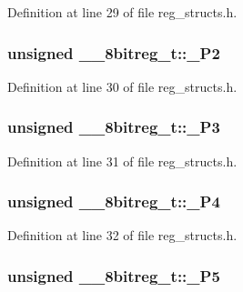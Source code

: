 Definition at line 29 of file reg\-\_\-structs.\-h.

\hypertarget{union____8bitreg__t_a30b9937367ef01f1adc9f4353c9c323e}{
\subsubsection[{\-\_\-\-P2}]{\setlength{\rightskip}{0pt plus 5cm}unsigned \-\_\-\-\_\-8bitreg\-\_\-t\-::\-\_\-\-P2}}\label{union____8bitreg__t_a30b9937367ef01f1adc9f4353c9c323e}


Definition at line 30 of file reg\-\_\-structs.\-h.

\hypertarget{union____8bitreg__t_a5d21a8af52e9e72f540bc6032d7c1047}{
\subsubsection[{\-\_\-\-P3}]{\setlength{\rightskip}{0pt plus 5cm}unsigned \-\_\-\-\_\-8bitreg\-\_\-t\-::\-\_\-\-P3}}\label{union____8bitreg__t_a5d21a8af52e9e72f540bc6032d7c1047}


Definition at line 31 of file reg\-\_\-structs.\-h.

\hypertarget{union____8bitreg__t_a8e1225a088df1088350fd78a57fa38b4}{
\subsubsection[{\-\_\-\-P4}]{\setlength{\rightskip}{0pt plus 5cm}unsigned \-\_\-\-\_\-8bitreg\-\_\-t\-::\-\_\-\-P4}}\label{union____8bitreg__t_a8e1225a088df1088350fd78a57fa38b4}


Definition at line 32 of file reg\-\_\-structs.\-h.

\hypertarget{union____8bitreg__t_a4a51fd205ff67d3523e92697adc2fc86}{
\subsubsection[{\-\_\-\-P5}]{\setlength{\rightskip}{0pt plus 5cm}unsigned \-\_\-\-\_\-8bitreg\-\_\-t\-::\-\_\-\-P5}}\label{union____8bitreg__t_a4a51fd205ff67d3523e92697adc2fc86}


